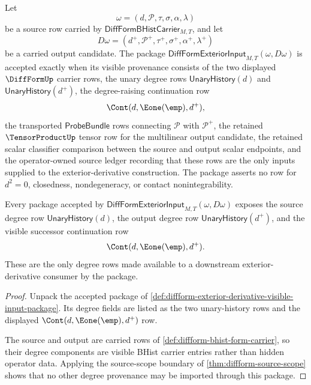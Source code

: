 \begin{definition}
\label{def:diffform-exterior-derivative-visible-input-package}
Let
$$
\omega=(d,\mathcal{P},\tau,\sigma,\alpha,\lambda)
$$
be a source row carried by $\mathsf{DiffFormBHistCarrier}_{M,T}$, and let
$$
D\omega=(d^+,\mathcal{P}^+,\tau^+,\sigma^+,\alpha^+,\lambda^+)
$$
be a carried output candidate. The package
$\mathsf{DiffFormExteriorInput}_{M,T}(\omega,D\omega)$ is accepted exactly
when its visible provenance consists of the two displayed $\DiffFormUp$
carrier rows, the unary degree rows $\mathsf{UnaryHistory}(d)$ and
$\mathsf{UnaryHistory}(d^+)$, the degree-raising continuation row
$$
\Cont(d,\Eone(\emp),d^+),
$$
the transported $\mathsf{ProbeBundle}$ rows connecting $\mathcal{P}$ with
$\mathcal{P}^+$, the retained $\TensorProductUp$ tensor row for the
multilinear output candidate, the retained scalar classifier comparison
between the source and output scalar endpoints, and the operator-owned source
ledger recording that these rows are the only inputs supplied to the
exterior-derivative construction. The package asserts no row for $d^2=0$,
closedness, nondegeneracy, or contact nonintegrability.
\end{definition}

\begin{theorem}
\label{thm:diffform-exterior-derivative-degree-successor-ledger}
Every package accepted by
$\mathsf{DiffFormExteriorInput}_{M,T}(\omega,D\omega)$ exposes the source
degree row $\mathsf{UnaryHistory}(d)$, the output degree row
$\mathsf{UnaryHistory}(d^+)$, and the visible successor continuation row
$$
\Cont(d,\Eone(\emp),d^+).
$$
These are the only degree rows made available to a downstream
exterior-derivative consumer by the package.
\end{theorem}
\begin{proof}
Unpack the accepted package of
\autoref{def:diffform-exterior-derivative-visible-input-package}. Its degree
fields are listed as the two unary-history rows and the displayed
$\Cont(d,\Eone(\emp),d^+)$ row.

The source and output are carried rows of
\autoref{def:diffform-bhist-form-carrier}, so their degree components are
visible BHist carrier entries rather than hidden operator data. Applying the
source-scope boundary of \autoref{thm:diffform-source-scope} shows that no
other degree provenance may be imported through this package.
\end{proof}

